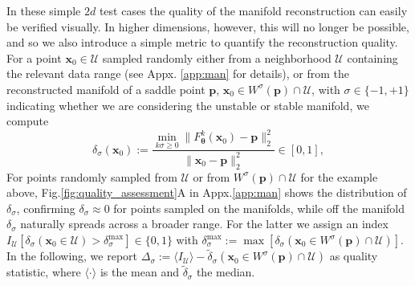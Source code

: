 \documentclass{article}
\theoremstyle{example}
\theoremstyle{plain}
\theoremstyle{definition}
\theoremstyle{remark}
\begin{document}
In these simple $2d$ test cases the quality of the manifold reconstruction can easily be verified visually. In higher dimensions, however, this will no longer be possible, and so we also introduce a simple metric to quantify the reconstruction quality. For a point $\bm{x}_0 \in \mathcal{U}$ sampled randomly either from a neighborhood $\mathcal{U}$ containing the relevant data range (see Appx. \ref{app:man} for details), or from the reconstructed manifold of a saddle point $\bm{p}$, $\bm{x}_0 \in W^{\sigma}(\bm{p}) \cap \mathcal{U}$, with $\sigma \in \{-1,+1\}$ indicating whether we are considering the unstable or stable manifold, we compute
\begin{equation}\label{eq:mf_metric}
    \delta_{\sigma}(\bm{x}_0):=\frac{\min_{k\sigma\geq0}\|F_{\boldsymbol{\theta}}^k(\bm{x}_0)-\bm{p}\|^2_2}{\|\bm{x}_0-\bm{p}\|^2_2} \in [0,1],
\end{equation}
For points randomly sampled from $\mathcal{U}$ or from $W^{\sigma}(\bm{p}) \cap \mathcal{U}$ for the example above, Fig.\ref{fig:quality_assessment}A in Appx.\ref{app:man} shows the distribution of $\delta_{\sigma}$, confirming $\delta_{\sigma} \approx0$ for points sampled on the manifolds, while off the manifold $\delta_{\sigma}$ naturally spreads across a broader range. For the latter we assign an index $I_\mathcal{U}[\delta_{\sigma}(\bm{x}_0 \in \mathcal{U})>\delta_{\sigma}^\text{max}] \in \{0,1\}$ with $\delta_{\sigma}^\text{max}:=\max[\delta_{\sigma}(\bm{x}_0\in W^{\sigma}(\bm{p}) \cap \mathcal{U})]$. 
In the following, we report $\Delta_{\sigma}:= \langle I_\mathcal{U} \rangle-\tilde{\delta}_{\sigma}(\bm{x}_0\in W^{\sigma}(\bm{p}) \cap \mathcal{U})$ as quality statistic, where $\langle \cdot \rangle$ is the mean and $\tilde{\delta}_{\sigma}$ the median.
\end{document}

